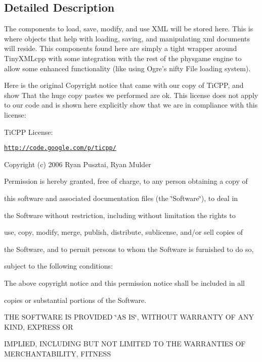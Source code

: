 \subsection{Detailed Description}
The components to load, save, modify, and use XML will be stored here. This is where objects that help with loading, saving, and manipulating xml documents will reside. This components found here are simply a tight wrapper around TinyXMLcpp with some integration with the rest of the physgame engine to allow some enhanced functionality (like using Ogre's nifty File loading system).\par
 Here is the original Copyright notice that came with our copy of TiCPP, and show That the huge copy pastes we performed are ok. This license does not apply to our code and is shown here explicitly show that we are in compliance with this license: \par
 \par
 TiCPP License: \par
 \par
 \href{http://code.google.com/p/ticpp/}{\tt http://code.google.com/p/ticpp/} \par
 Copyright (c) 2006 Ryan Pusztai, Ryan Mulder \par
 \par
 Permission is hereby granted, free of charge, to any person obtaining a copy of \par
 this software and associated documentation files (the \char`\"{}Software\char`\"{}), to deal in \par
 the Software without restriction, including without limitation the rights to \par
 use, copy, modify, merge, publish, distribute, sublicense, and/or sell copies of \par
 the Software, and to permit persons to whom the Software is furnished to do so, \par
 subject to the following conditions: \par
 \par
 The above copyright notice and this permission notice shall be included in all \par
 copies or substantial portions of the Software. \par
 \par
 THE SOFTWARE IS PROVIDED \char`\"{}AS IS\char`\"{}, WITHOUT WARRANTY OF ANY KIND, EXPRESS OR \par
 IMPLIED, INCLUDING BUT NOT LIMITED TO THE WARRANTIES OF MERCHANTABILITY, FITNESS \par
